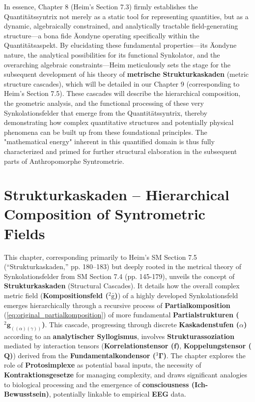 \documentclass[12pt]{article}
\newcommand{\q}[1]{\enquote{#1}}
\newcommand{\kompositionsfeld}{{}^2\bar{\mathrm{g}}}
\newcommand{\partialstruktur}[1]{{}^2\mathbf{g}_{(#1)}}
\newcommand{\fundamentalkondensor}{{}^3\bm{\Gamma}}
\newcommand{\korrelationstensor}{\mathbf{f}}
\newcommand{\koppelungstensor}{\mathbf{Q}}
\newcommand{\kaskadenstufe}{\alpha}
\begin{document}
In essence, Chapter 8 (Heim's Section 7.3) firmly establishes the Quantitätssyntrix not merely as a static tool for representing quantities, but as a dynamic, algebraically constrained, and analytically tractable field-generating structure—a bona fide Äondyne operating specifically within the Quantitätsaspekt. By elucidating these fundamental properties—its Äondyne nature, the analytical possibilities for its functional Synkolator, and the overarching algebraic constraints—Heim meticulously sets the stage for the subsequent development of his theory of \textbf{metrische Strukturkaskaden} (metric structure cascades), which will be detailed in our Chapter 9 (corresponding to Heim's Section 7.5). These cascades will describe the hierarchical composition, the geometric analysis, and the functional processing of these very Synkolationsfelder that emerge from the Quantitätssyntrix, thereby demonstrating how complex quantitative structures and potentially physical phenomena can be built up from these foundational principles. The "mathematical energy" inherent in this quantified domain is thus fully characterized and primed for further structural elaboration in the subsequent parts of Anthropomorphe Syntrometrie.

\clearpage 
\section{Strukturkaskaden – Hierarchical Composition of Syntrometric Fields}
\label{sec:chapter9}

This chapter, corresponding primarily to Heim's SM Section 7.5 (\q{Strukturkaskaden,} pp. 180–183) but deeply rooted in the metrical theory of Synkolationsfelder from SM Section 7.4 (pp. 145-179), unveils the concept of \textbf{Strukturkaskaden} (Structural Cascades). It details how the overall complex metric field (\textbf{Kompositionsfeld (\(\kompositionsfeld\))}) of a highly developed Synkolationsfeld emerges hierarchically through a recursive process of \textbf{Partialkomposition} (\eqref{eq:original_partialkomposition}) of more fundamental \textbf{Partialstrukturen (\(\partialstruktur{(\alpha)(\gamma)}\))}. This cascade, progressing through discrete \textbf{Kaskadenstufen (\(\kaskadenstufe\))} according to an \textbf{analytischer Syllogismus}, involves \textbf{Strukturassoziation} mediated by interaction tensors (\textbf{Korrelationstensor (\(\korrelationstensor\))}, \textbf{Koppelungstensor (\(\koppelungstensor\))}) derived from the \textbf{Fundamentalkondensor (\(\fundamentalkondensor\))}. The chapter explores the role of \textbf{Protosimplexe} as potential basal inputs, the necessity of \textbf{Kontraktionsgesetze} for managing complexity, and draws significant analogies to biological processing and the emergence of \textbf{consciousness (Ich-Bewusstsein)}, potentially linkable to empirical \textbf{EEG} data.
\end{document}
